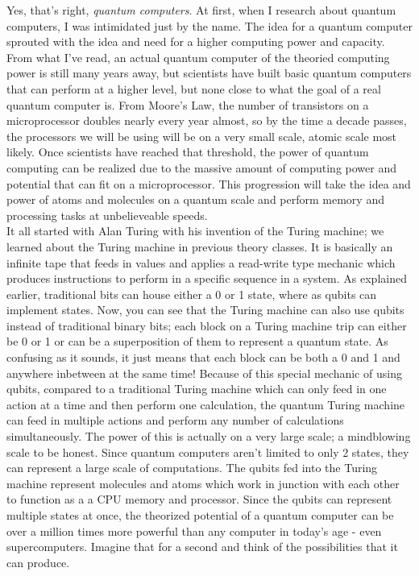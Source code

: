 \documentclass[11pt]{article}
\begin{document}
\indent Yes, that's right, \emph{quantum computers}. At first, when I research about quantum computers, I was intimidated just by the name. The idea for a quantum computer sprouted with the idea and need for a higher computing power and capacity. From what I've read, an actual quantum computer of the theoried computing power is still many years away, but scientists have built basic quantum computers that can perform at a higher level, but none close to what the goal of a real quantum computer is. From Moore's Law, the number of transistors on a microprocessor doubles nearly every year almost, so by the time a decade passes, the processors we will be using will be on a very small scale, atomic scale most likely. Once scientists have reached that threshold, the power of quantum computing can be realized due to the massive amount of computing power and potential that can fit on a microprocessor. This progression will take the idea and power of atoms and molecules on a quantum scale and perform memory and processing tasks at unbelieveable speeds.\\
\indent It all started with Alan Turing with his invention of the Turing machine; we learned about the Turing machine in previous theory classes. It is basically an infinite tape that feeds in values and applies a read-write type mechanic which produces instructions to perform in a specific sequence in a system. As explained earlier, traditional bits can house either a 0 or 1 state, where as qubits can implement states. Now, you can see that the Turing machine can also use qubits instead of traditional binary bits; each block on a Turing machine trip can either be 0 or 1 or can be a superposition of them to represent a quantum state. As confusing as it sounds, it just means that each block can be both a 0 and 1 and anywhere inbetween at the same time! Because of this special mechanic of using qubits, compared to a traditional Turing machine which can only feed in one action at a time and then perform one calculation, the quantum Turing machine can feed in multiple actions and perform any number of calculations simultaneously. The power of this is actually on a very large scale; a mindblowing scale to be honest. Since quantum computers aren't limited to only 2 states, they can represent a large scale of computations. The qubits fed into the Turing machine represent molecules and atoms which work in junction with each other to function as a a CPU memory and processor. Since the qubits can represent multiple states at once, the theorized potential of a quantum computer can be over a million times more powerful than any computer in today's age - even supercomputers. Imagine that for a second and think of the possibilities that it can produce.\\
\end{document}
